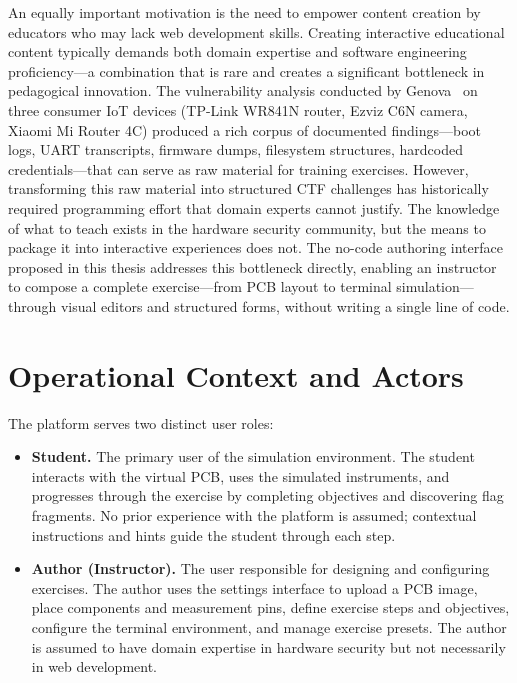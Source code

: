 An equally important motivation is the need to empower content creation by educators who may lack web development skills. Creating interactive educational content typically demands both domain expertise and software engineering proficiency---a combination that is rare and creates a significant bottleneck in pedagogical innovation. The vulnerability analysis conducted by Genova~\cite{genova2025} on three consumer IoT devices (TP-Link WR841N router, Ezviz C6N camera, Xiaomi Mi Router 4C) produced a rich corpus of documented findings---boot logs, UART transcripts, firmware dumps, filesystem structures, hardcoded credentials---that can serve as raw material for training exercises. However, transforming this raw material into structured CTF challenges has historically required programming effort that domain experts cannot justify. The knowledge of what to teach exists in the hardware security community, but the means to package it into interactive experiences does not. The no-code authoring interface proposed in this thesis addresses this bottleneck directly, enabling an instructor to compose a complete exercise---from PCB layout to terminal simulation---through visual editors and structured forms, without writing a single line of code.

\section{Operational Context and Actors}\label{sec:actors}

The platform serves two distinct user roles:

\begin{itemize}
    \item \textbf{Student.} The primary user of the simulation environment. The student interacts with the virtual PCB, uses the simulated instruments, and progresses through the exercise by completing objectives and discovering flag fragments. No prior experience with the platform is assumed; contextual instructions and hints guide the student through each step.

    \item \textbf{Author (Instructor).} The user responsible for designing and configuring exercises. The author uses the settings interface to upload a PCB image, place components and measurement pins, define exercise steps and objectives, configure the terminal environment, and manage exercise presets. The author is assumed to have domain expertise in hardware security but not necessarily in web development.
\end{itemize}

